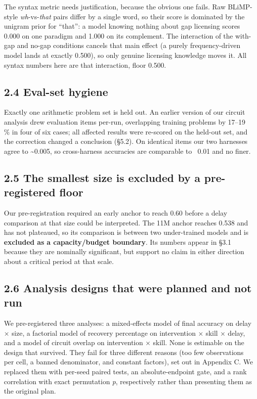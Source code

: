 \documentclass[11pt]{article}
\begin{document}
The syntax metric needs justification, because the obvious one fails. Raw BLiMP-style
\emph{wh}-vs-\emph{that} pairs differ by a single word, so their score is dominated by the unigram prior
for ``that'': a model knowing nothing about gap licensing scores 0.000 on one paradigm and
1.000 on its complement. The interaction of the with-gap and no-gap conditions cancels that
main effect (a purely frequency-driven model lands at exactly 0.500), so only genuine
licensing knowledge moves it. All syntax numbers here are that interaction, floor 0.500.

\subsection{2.4 Eval-set hygiene}\label{eval-set-hygiene}

Exactly one arithmetic problem set is held out. An earlier version of our circuit analysis
drew evaluation items per-run, overlapping training problems by 17--19 \% in four of six
cases; all affected results were re-scored on the held-out set, and the correction changed a
conclusion (§5.2). On identical items our two harnesses agree to \textasciitilde0.005, so cross-harness
accuracies are comparable to ~0.01 and no finer.

\subsection{2.5 The smallest size is excluded by a pre-registered floor}\label{the-smallest-size-is-excluded-by-a-pre-registered-floor}

Our pre-registration required an early anchor to reach 0.60 before a delay comparison at that
size could be interpreted. The 11M anchor reaches 0.538 and has not plateaued, so its
comparison is between two under-trained models and is \textbf{excluded as a capacity/budget
boundary}. Its numbers appear in §3.1 because they are nominally significant, but support no
claim in either direction about a critical period at that scale.

\subsection{2.6 Analysis designs that were planned and not run}\label{analysis-designs-that-were-planned-and-not-run}

We pre-registered three analyses: a mixed-effects model of final accuracy on delay × size, a factorial model of recovery percentage on intervention × skill × delay, and a model of circuit overlap on intervention × skill. None is estimable on the design that survived. They fail for three different reasons (too few observations per cell, a banned denominator, and constant factors), set out in Appendix C. We replaced them with per-seed paired tests, an absolute-endpoint gate, and a rank correlation with exact permutation \emph{p}, respectively rather than presenting them as the original plan.
\end{document}
